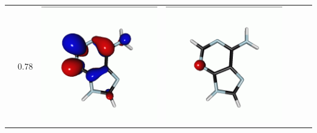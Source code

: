 \documentclass[journal=jctcce,manuscript=article]{achemso}
\begin{document}
\begin{table}[H]
\begin{tabular}{ l | c c c | c c c }
\begin{minipage}{0.2\textwidth}
    \end{minipage}
    & 0.78
    &  \begin{minipage}{0.2\textwidth}
        \centering
        \includegraphics[scale=0.10]{NTO/Adenine_N/2p_C1.png}
    \end{minipage}
    & 
    \begin{minipage}{0.2\textwidth}
        \centering
        \includegraphics[scale=0.10]{NTO/Adenine_N/2h_Cs.png}

\end{minipage}
\end{tabular}
\end{table}
\end{document}
